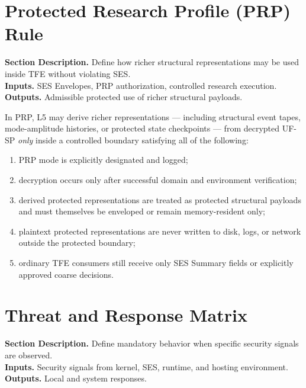 \documentclass[11pt]{report}
\newcommand{\meta}[3]{\textbf{Section Description.} #1\\
\textbf{Inputs.} #2\\
\textbf{Outputs.} #3\par}
\begin{document}
\section{Protected Research Profile (PRP) Rule}
\meta{Define how richer structural representations may be used inside TFE without violating SES.}{SES Envelopes, PRP authorization, controlled research execution.}{Admissible protected use of richer structural payloads.}

In PRP, L5 may derive richer representations --- including structural event tapes, mode-amplitude histories, or protected state checkpoints --- from decrypted UF-SP \emph{only} inside a controlled boundary satisfying all of the following:
\begin{enumerate}[leftmargin=1.2cm]
    \item PRP mode is explicitly designated and logged;
    \item decryption occurs only after successful domain and environment verification;
    \item derived protected representations are treated as protected structural payloads and must themselves be enveloped or remain memory-resident only;
    \item plaintext protected representations are never written to disk, logs, or network outside the protected boundary;
    \item ordinary TFE consumers still receive only SES Summary fields or explicitly approved coarse decisions.
\end{enumerate}

\section{Threat and Response Matrix}
\meta{Define mandatory behavior when specific security signals are observed.}{Security signals from kernel, SES, runtime, and hosting environment.}{Local and system responses.}
\end{document}
